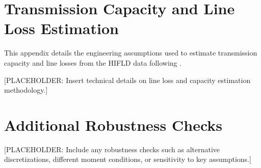 \documentclass[12pt]{article}
\begin{document}
\section{Transmission Capacity and Line Loss Estimation} \label{sec:appendixc}

This appendix details the engineering assumptions used to estimate transmission capacity and line losses from the HIFLD data following \cite{arkolakis2023clean}.

[PLACEHOLDER: Insert technical details on line loss and capacity estimation methodology.]

\section{Additional Robustness Checks} \label{sec:appendixd}

[PLACEHOLDER: Include any robustness checks such as alternative discretizations, different moment conditions, or sensitivity to key assumptions.]
\end{document}
